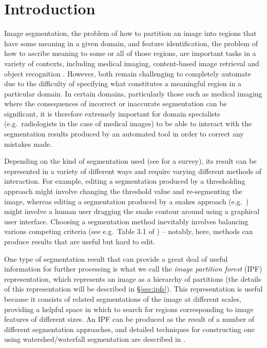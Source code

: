\documentclass[10pt,twocolumn,twoside]{IEEEtran}
\begin{document}
\section{Introduction}


Image segmentation, the problem of how to partition an image into regions that have some meaning in a given domain, and feature identification, the problem of how to ascribe meaning to some or all of those regions, are important tasks in a variety of contexts, including medical imaging, content-based image retrieval \cite{?} and object recognition \cite{?}. However, both remain challenging to completely automate due to the difficulty of specifying what constitutes a meaningful region in a particular domain. In certain domains, particularly those such as medical imaging where the consequences of incorrect or inaccurate segmentation can be significant, it is therefore extremely important for domain specialists (e.g.~radiologists in the case of medical images) to be able to interact with the segmentation results produced by an automated tool in order to correct any mistakes made.

Depending on the kind of segmentation used (see \cite{golodetz11} for a survey), its result can be represented in a variety of different ways and require varying different methods of interaction. For example, editing a segmentation produced by a thresholding approach might involve changing the threshold value and re-segmenting the image, whereas editing a segmentation produced by a snakes approach (e.g.~\cite{kass88,lobregt95}) might involve a human user dragging the snake contour around using a graphical user interface. Choosing a segmentation method inevitably involves balancing various competing criteria (see e.g.~Table 3.1 of \cite{golodetz11}) -- notably, here, methods can produce results that are useful but hard to edit.

One type of segmentation result that can provide a great deal of useful information for further processing is what we call the \emph{image partition forest} (IPF) representation, which represents an image as a hierarchy of partitions (the details of this representation will be described in \S\ref{sec:ipfs}). This representation is useful because it consists of related segmentations of the image at different scales, providing a helpful space in which to search for regions corresponding to image features of different sizes. An IPF can be produced as the result of a number of different segmentation approaches, and detailed techniques for constructing one using watershed/waterfall segmentation are described in \cite{golodetz11}.
\end{document}
